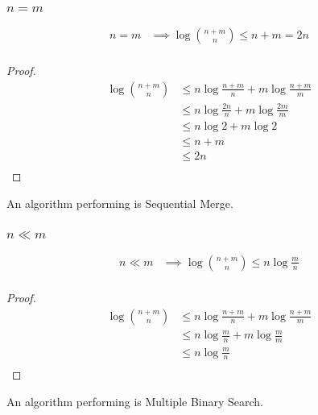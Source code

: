 \subsubsection{$n = m$}

\begin{lemma}
\begin{align*}
n = m &\implies \log\binom{n+m}{n} \leq n + m = 2n\\
\end{align*}
\end{lemma}

\begin{proof}
\begin{align*}
\log\binom{n+m}{n} &\leq n \log\frac{n+m}{n} + m \log\frac{n+m}{m}\\
&\leq n \log\frac{2n}{n} + m \log\frac{2m}{m}\\
&\leq n \log 2 + m \log 2\\
&\leq n + m\\
&\leq 2n\\
\end{align*}
\end{proof}

An algorithm performing  is Sequential Merge.

\subsubsection{$n \ll m$}

\begin{lemma}
\begin{align*}
n \ll m &\implies \log\binom{n+m}{n} \leq n \log\frac{m}{n}\\
\end{align*}
\end{lemma}

\begin{proof}
\begin{align*}
\log\binom{n+m}{n} &\leq n \log\frac{n+m}{n} + m \log\frac{n+m}{m}\\
&\leq n \log\frac{m}{n} + m \log\frac{m}{m}\\
&\leq n \log\frac{m}{n}\\
\end{align*}
\end{proof}

An algorithm performing  is Multiple Binary Search.